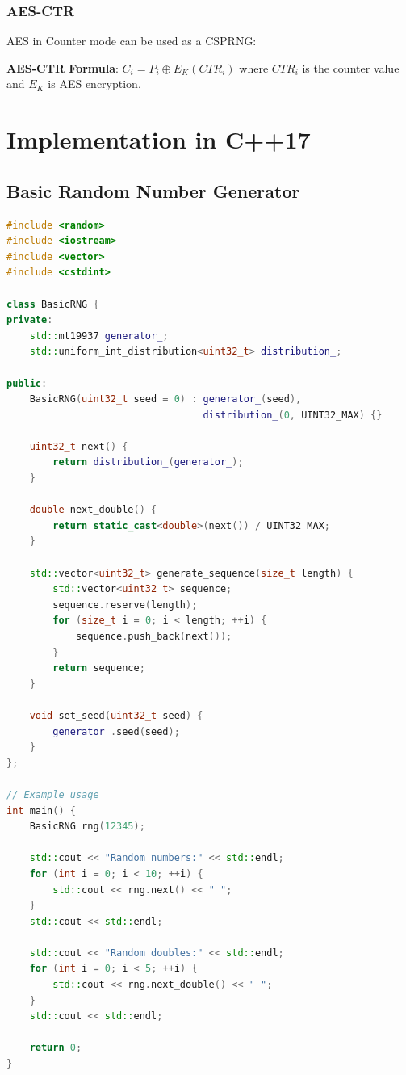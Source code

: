 \documentclass[11pt,a4paper]{article}
\begin{document}
\subsubsection{AES-CTR}

AES in Counter mode can be used as a CSPRNG:

\begin{mathbox}
\textbf{AES-CTR Formula}: $C_i = P_i \oplus E_K(CTR_i)$
where $CTR_i$ is the counter value and $E_K$ is AES encryption.
\end{mathbox}

\section{Implementation in C++17}

\subsection{Basic Random Number Generator}

\begin{lstlisting}[language=C++, caption=Basic Random Number Generator Implementation]
#include <random>
#include <iostream>
#include <vector>
#include <cstdint>

class BasicRNG {
private:
    std::mt19937 generator_;
    std::uniform_int_distribution<uint32_t> distribution_;
    
public:
    BasicRNG(uint32_t seed = 0) : generator_(seed), 
                                  distribution_(0, UINT32_MAX) {}
    
    uint32_t next() {
        return distribution_(generator_);
    }
    
    double next_double() {
        return static_cast<double>(next()) / UINT32_MAX;
    }
    
    std::vector<uint32_t> generate_sequence(size_t length) {
        std::vector<uint32_t> sequence;
        sequence.reserve(length);
        for (size_t i = 0; i < length; ++i) {
            sequence.push_back(next());
        }
        return sequence;
    }
    
    void set_seed(uint32_t seed) {
        generator_.seed(seed);
    }
};

// Example usage
int main() {
    BasicRNG rng(12345);
    
    std::cout << "Random numbers:" << std::endl;
    for (int i = 0; i < 10; ++i) {
        std::cout << rng.next() << " ";
    }
    std::cout << std::endl;
    
    std::cout << "Random doubles:" << std::endl;
    for (int i = 0; i < 5; ++i) {
        std::cout << rng.next_double() << " ";
    }
    std::cout << std::endl;
    
    return 0;
}
\end{lstlisting}
\end{document}
